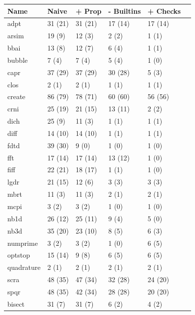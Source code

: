 \begin{table}
\centering
  \begin{tabular}{| l | l | l | l | l | l |}
  \hline
  Name & Naive & + Prop & - Builtins & + Checks \\ \hline
  adpt        & 31 (21) & 31 (21) & 17 (14)& 17 (14) \\ \hline
  arsim       & 19 (9) & 12 (3) & 2 (2) & 1 (1) \\ \hline
  bbai        & 13 (8) & 12 (7) & 6 (4) & 1 (1) \\ \hline
  bubble      & 7 (4) & 7 (4) & 5 (4) & 1 (0) \\ \hline
  capr        & 37 (29) & 37 (29) & 30 (28) & 5 (3) \\ \hline
  clos        & 2 (1) & 2 (1) & 1 (1) & 1 (1) \\ \hline
  create      & 86 (79) & 78 (71) & 60 (60) & 56 (56) \\ \hline
  crni        & 25 (19) & 21 (15) & 13 (11) & 2 (2) \\ \hline
  dich        & 25 (9) & 11 (3) & 1 (1) & 1 (1)  \\ \hline
  diff        & 14 (10) & 14 (10) & 1 (1) & 1 (1) \\ \hline
  fdtd        & 39 (30) & 9 (0) & 1 (0) & 1 (0) \\ \hline
  fft         & 17 (14) & 17 (14) & 13 (12) & 1 (0) \\ \hline
  fiff        & 22 (21) & 18 (17) & 1 (1) & 1 (0) \\ \hline
  lgdr        & 21 (15) & 12 (6) & 3 (3) & 3 (3) \\ \hline
  mbrt        & 11 (3) & 11 (3) & 2 (1) & 2 (1) \\ \hline
  mcpi        & 3 (2) & 3 (2) & 1 (0) & 1 (0) \\ \hline
  nb1d        & 26 (12) & 25 (11) & 9 (4) & 5 (0) \\ \hline
  nb3d        & 35 (20) & 23 (10) & 8 (5) & 6 (3) \\ \hline
  numprime    & 3 (2) & 3 (2) & 1 (0) & 6 (5) \\ \hline
  optstop     & 15 (14) & 9 (8) & 6 (5) & 6 (5) \\ \hline
  quadrature  & 2 (1) & 2 (1) & 2 (1) & 2 (1)\\ \hline
  scra        & 48 (35) & 47 (34) & 32 (28) & 24 (20) \\ \hline
  spqr        & 48 (35) & 42 (34) & 28 (28) & 20 (20) \\ \hline
  bisect      & 31 (7) & 31 (7) & 6 (2) & 4 (2) \\ \hline

\end{tabular}
\end{table}
